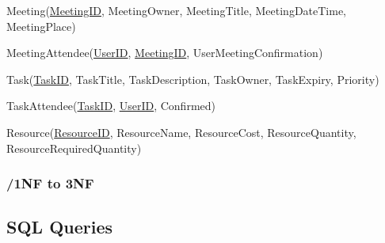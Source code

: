 Meeting(\underline{MeetingID}, MeetingOwner, MeetingTitle, MeetingDateTime, MeetingPlace)

MeetingAttendee(\underline{UserID}, \underline{MeetingID}, UserMeetingConfirmation)

Task(\underline{TaskID}, TaskTitle, TaskDescription, TaskOwner, TaskExpiry, Priority)

TaskAttendee(\underline{TaskID}, \underline{UserID}, Confirmed)

Resource(\underline{ResourceID}, ResourceName, ResourceCost, ResourceQuantity, ResourceRequiredQuantity)

\subsubsection{/1NF to 3NF}


\subsection{SQL Queries}

